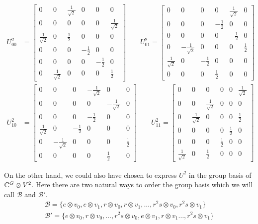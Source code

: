 \documentclass[11pt,reqno]{amsart}
\numberwithin{equation}{section}
\begin{document}
	\begin{align}
		U^2_{00} &= \begin{bmatrix}
		0 & 0 & \frac{1}{\sqrt{2}} & 0 & 0 & 0 \\
		0 & 0 & 0 &0 &0 &\frac{1}{\sqrt{2}}\\
		\frac{1}{\sqrt{2}} & 0 & \frac{1}{2} & 0 & 0 &0 \\
		0 & 0 & 0 & -\frac{1}{2} &0 & 0 \\
		0 &0 &0 &0 &-\frac{1}{2} & 0\\
		0 &\frac{1}{\sqrt{2}} &0 &0 &0 & \frac{1}{2}
		\end{bmatrix}
		\qquad U^2_{01}=\begin{bmatrix}
		0 & 0 & 0 &  0&\frac{1}{\sqrt{2}}  & 0 \\
		0 &0 &0 &-\frac{1}{2}&0  & 0\\
		0 & 0 & 0  &0& -\frac{1}{2} & 0 \\
		0 & -\frac{1}{\sqrt{2}} & 0 & 0 & 0 &\frac{1}{2} \\
		\frac{1}{\sqrt{2}} &0 & -\frac{1}{2}&0 &0 &0 \\
		0 &0 &0 &\frac{1}{2}&0  & 0
		\end{bmatrix}\nonumber\\
		U^2_{10}&= \begin{bmatrix}
		0 &0 &0 &-\frac{1}{\sqrt{2}} &0 & 0\\
		0 & 0 & 0 &  0 &-\frac{1}{\sqrt{2}} & 0 \\
		0 &0 &0 &-\frac{1}{2}&0  & 0\\
		\frac{1}{\sqrt{2}} & 0& -\frac{1}{2} &0 &0 &0 \\
		0 & -\frac{1}{\sqrt{2}} & 0& 0 & 0 &\frac{1}{2} \\
		0 & 0 & 0  &0 & \frac{1}{2}& 0 
		\end{bmatrix}
		\qquad U^2_{11}=\begin{bmatrix}
		0 & 0 & 0 &0 &0 &\frac{1}{\sqrt{2}}\\
		0 & 0 & \frac{1}{\sqrt{2}} & 0 & 0 & 0\\
		0 &\frac{1}{\sqrt{2}} &0 &0 &0 & \frac{1}{2}\\
		0 & 0 & 0 & 0 &\frac{1}{2} & 0\\
		0 & 0 & 0 & \frac{1}{2} &0 & 0 \\
		\frac{1}{\sqrt{2}} & 0 & \frac{1}{2} & 0 & 0 &0 
		\end{bmatrix}
	\end{align}
	
	On the other hand, we could also have chosen to express $U^2$ in the group basis of $\mathbb{C}^G \otimes V^2$.
	Here there are two natural ways to order the group basis which we will call $\mathcal{B}$ and $\mathcal{B}'$.
	\begin{align*}
		\mathcal{B}=\{e\otimes v_0,e\otimes v_1,r\otimes v_0, r\otimes v_1,\ldots, r^2s \otimes v_0, r^2s\otimes v_1  \}\\
		\mathcal{B'}=\{e\otimes v_0,r\otimes v_0,\ldots,r^2s\otimes v_0, e\otimes v_1, r\otimes v_1\ldots, r^2s\otimes v_1\}
	\end{align*}
	
\end{document}
